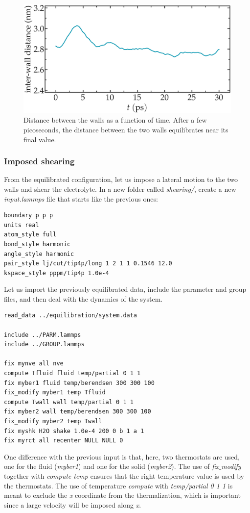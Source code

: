 \documentclass[9pt,tutorial]{livecoms}
\begin{document}
\begin{figure}
\centering
\includegraphics[width=\linewidth]{NANOSHEAR-equilibration}
\caption{Distance between the walls as a function of time. After a few picoseconds, the distance between the two walls equilibrates near its final value.}
\label{fig:NANOSHEAR-equilibration}
\end{figure}

\subsubsection{Imposed shearing}

From the equilibrated configuration, let us impose a lateral motion to the two walls and shear the electrolyte.
In a new folder called \textit{shearing/}, create a new \textit{input.lammps} file that starts like the previous ones:
{\normalsize \begin{verbatim}
boundary p p p
units real
atom_style full
bond_style harmonic
angle_style harmonic
pair_style lj/cut/tip4p/long 1 2 1 1 0.1546 12.0
kspace_style pppm/tip4p 1.0e-4
\end{verbatim}}
Let us import the previously equilibrated data, include the parameter and group files, and then deal with the dynamics of the system.
{\normalsize \begin{verbatim}
read_data ../equilibration/system.data

include ../PARM.lammps
include ../GROUP.lammps

fix mynve all nve
compute Tfluid fluid temp/partial 0 1 1
fix myber1 fluid temp/berendsen 300 300 100
fix_modify myber1 temp Tfluid
compute Twall wall temp/partial 0 1 1
fix myber2 wall temp/berendsen 300 300 100
fix_modify myber2 temp Twall
fix myshk H2O shake 1.0e-4 200 0 b 1 a 1
fix myrct all recenter NULL NULL 0
\end{verbatim}}
One difference with the previous input is that, here, two thermostats are used, one for the fluid (\textit{myber1}) and one for the solid (\textit{myber2}). The use of \textit{fix$\_$modify} together with \textit{compute temp} ensures that the right temperature value is used by the thermostats. The use of temperature \textit{compute} with \textit{temp/partial 0 1 1} is meant to exclude the \textit{x} coordinate from the thermalization, which is important since a large velocity will be imposed along \textit{x}. 
\end{document}
